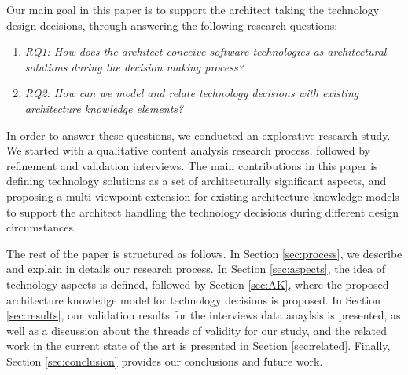 \documentclass[conference]{IEEEtran}
\begin{document}
Our main goal in this paper is to support the architect taking the technology
design decisions, through answering the following research questions:
\begin{enumerate}
\item \textit{RQ1: How does the architect conceive software technologies as
architectural solutions during the decision making process?}
\item \textit{RQ2: How can we model and relate technology decisions with
existing architecture knowledge elements?}
\end{enumerate}
In order to answer these questions, we conducted an explorative research
study. We started with a qualitative content analysis research process, followed
by refinement and validation interviews. The main contributions in this paper is
defining technology solutions as a set of architecturally significant aspects,
and proposing a multi-viewpoint extension for existing architecture
knowledge models to support the architect handling the technology decisions
during different design circumstances.

The rest of the paper is structured as follows. In Section \ref{sec:process}, we
describe and explain in details our research process. In Section
\ref{sec:aspects}, the idea of technology aspects is defined, followed by
Section \ref{sec:AK}, where the proposed architecture knowledge model for
technology decisions is proposed. In Section \ref{sec:results}, our validation
results for the interviews data anaylsis is presented, as well as a discussion
about the threads of validity for our study, and the related
work in the current state of the art is presented in Section \ref{sec:related}.
Finally, Section \ref{sec:conclusion} provides our conclusions and future work.
\end{document}
